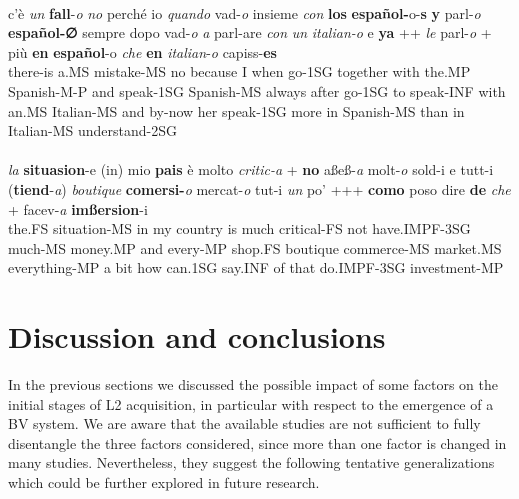 \documentclass[output=paper]{langscibook}
\begin{document}
\ea%
    \citep{Schmid1994}\label{ex:benazzo:10}\\
    \gll            c’è        \textit{un}       \textbf{fall}{}-\textit{o}            \textit{no} perché   io \textit{quando} vad-\textit{o}     insieme \textit{con}   \textbf{los}        \textbf{español{}-}o-\textbf{s}  \textbf{y}     parl-\textit{o}         \textbf{español{}-∅}    sempre  dopo  vad-\textit{o}     \textit{a} parl-are      \textit{con}  \textit{un}        \textit{italian-o}      e     \textbf{ya} ++    \textit{le}   parl-\textit{o} +      più    \textbf{en} \textbf{español}{}-o     \textit{che}  \textbf{en}  \textit{italian}{}-\textit{o}      capiss{}-\textbf{es}\\
    there-is a.MS  mistake-MS no  because I   when     go-1SG together with the.MP Spanish-M-P   and speak-1SG Spanish-MS  always  after  go-1SG  to speak-INF with an.MS Italian-MS  and by-now {} her speak-1SG {} more in  Spanish-MS than in   Italian-MS  understand-2SG\\
\ex%
    \citep[90]{Vietti2005}\label{ex:benazzo:11}\\
    \gll           \textit{la}         \textbf{situasion}{}-e       (in) mio \textbf{pais}      è  molto \textit{critic-a} + \textbf{no}  aßeß{}-\textit{a}                 molt-\textit{o}       sold-i          e     tutt{}-i         (\textbf{tiend}{}-\textit{a}) \textit{boutique}  \textbf{comersi{}-}\textit{o}         mercat{}-\textit{o}      tut{}-i                    \textit{un} po’ +++ \textbf{como} poso        dire        \textbf{de}  \textit{che} + facev-\textit{a}            \textbf{imßersion}{}-i\\
    the.FS  situation-MS     in  my   country is much  critical-FS {} not have.IMPF-3SG  much-MS money.MP and every-MP shop.FS  boutique  commerce-MS  market.MS   everything-MP  a bit {} how   can.1SG  say.INF  of  that  {} do.IMPF-3SG  investment-MP\\
\z

\section{Discussion and conclusions}\label{sec:benazzo:5}

In the previous sections we discussed the possible impact of some factors on the initial stages of L2 acquisition, in particular with respect to the emergence of a BV system. We are aware that the available studies are not sufficient to fully disentangle the three factors considered, since more than one factor is changed in many studies. Nevertheless, they suggest the following tentative generalizations which could be further explored in future research. 
\end{document}
